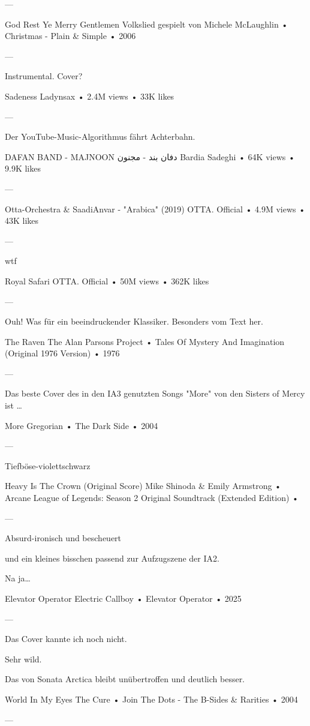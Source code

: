 —

God Rest Ye Merry Gentlemen
Volkslied
gespielt von Michele McLaughlin
 •
Christmas - Plain & Simple
 •
2006

—

Instrumental. Cover?

Sadeness
Ladynsax
 • 2.4M views • 33K likes

—

Der YouTube-Music-Algorithmus fährt Achterbahn.

DAFAN BAND - MAJNOON دفان بند - مجنون
Bardia Sadeghi
 • 64K views • 9.9K likes

—

Otta-Orchestra & SaadiAnvar - "Arabica" (2019)
OTTA. Official
 • 4.9M views • 43K likes

—

wtf

Royal Safari
OTTA. Official
 • 50M views • 362K likes

—

Ouh! Was für ein beeindruckender Klassiker. Besonders vom Text her.

The Raven
The Alan Parsons Project
 •
Tales Of Mystery And Imagination (Original 1976 Version)
 • 1976

—

Das beste Cover des in den IA3 genutzten Songs "More" von den Sisters of Mercy ist …

More
Gregorian
 •
The Dark Side
 • 2004

—

Tiefböse-violettschwarz

Heavy Is The Crown (Original Score)
Mike Shinoda
 &
Emily Armstrong
 •
Arcane League of Legends: Season 2 Original Soundtrack (Extended Edition)
 •

—

Absurd-ironisch und bescheuert

und ein kleines bisschen passend zur Aufzugszene der IA2.

Na ja…

Elevator Operator
Electric Callboy
 •
Elevator Operator
 •
2025

—

Das Cover kannte ich noch nicht.

Sehr wild.

Das von Sonata Arctica bleibt unübertroffen und deutlich besser.

World In My Eyes
The Cure
 •
Join The Dots - The B-Sides & Rarities
 •
2004

—

